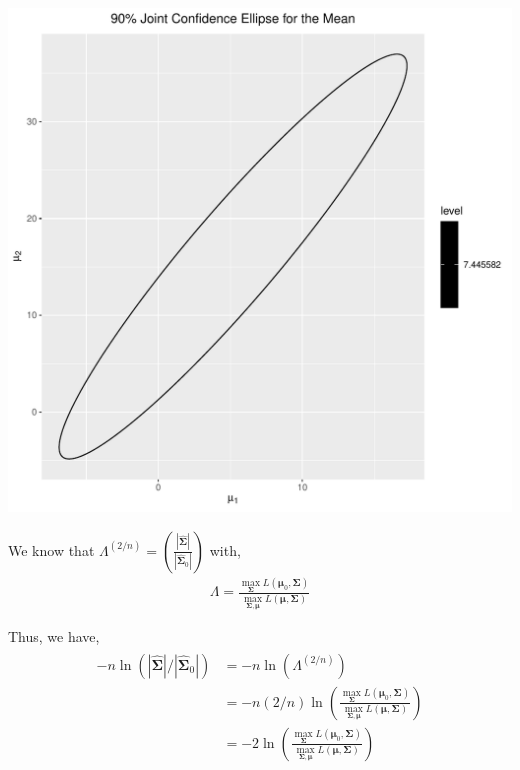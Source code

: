 \documentclass[12pt]{article}\usepackage[]{graphicx}\usepackage[]{color}
\makeatletter
\def\maxwidth{ %
  \ifdim\Gin@nat@width>\linewidth
    \linewidth
  \else
    \Gin@nat@width
  \fi
}
\newenvironment{knitrout}{}{} %
\newenvironment{problem}[2][Problem]{\begin{trivlist}
\item[\hskip \labelsep {\bfseries #1}\hskip \labelsep {\bfseries #2.}]}{\end{trivlist}}
\newcommand{\vct}{\mathbf}
\makeatother
\begin{document}
\begin{knitrout}
\color{fgcolor}
\includegraphics[width=\maxwidth]{figure/unnamed-chunk-3-1} 

\end{knitrout}


\newpage
\begin{problem}{5.13}
\end{problem}

We know that $\Lambda^{(2/n)} = \left(\frac{|\hat{\vct{\Sigma}}|}{|\hat{\vct{\Sigma}}_0|}\right)$ with,
\begin{align*}
\Lambda = \frac{\max_{\vct{\Sigma}} L(\vct{\mu}_0, \vct{\Sigma})}{\max_{\vct{\Sigma}, \vct{\mu}} L(\vct{\mu}, \vct{\Sigma})}
\end{align*}

Thus, we have,
\begin{align}
\begin{split}
-n \ln{(|\hat{\vct{\Sigma}}|/|\hat{\vct{\Sigma}}_0|)} &= -n \ln{(\Lambda^{(2/n)})}\\
&= -n (2/n) \ln{\left(\frac{\max_{\vct{\Sigma}} L(\vct{\mu}_0, \vct{\Sigma})}{\max_{\vct{\Sigma}, \vct{\mu}} L(\vct{\mu}, \vct{\Sigma})}\right)}\\
&= -2 \ln{\left(\frac{\max_{\vct{\Sigma}} L(\vct{\mu}_0, \vct{\Sigma})}{\max_{\vct{\Sigma}, \vct{\mu}} L(\vct{\mu}, \vct{\Sigma})}\right)}
\end{split}
\end{align}
\end{document}
